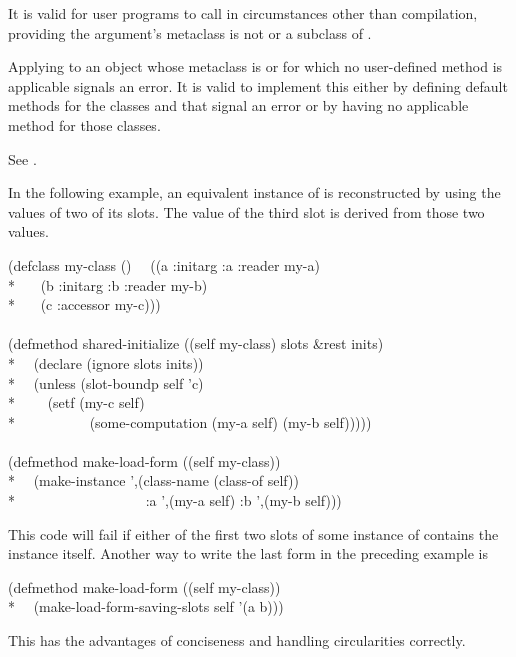 \begin{newer}
\begin{defun}
  It is valid for user programs to call  in
  circumstances other than compilation, providing the argument's
  metaclass is not  or a subclass of .

  Applying  to an object whose metaclass is  or
   for which no user-defined method is applicable signals
  an error.  It is valid to implement this either by defining default
  methods for the classes  and  that signal an error
  or by having no applicable method for those classes.

See .

In the following example, an equivalent instance of  is reconstructed
  by using the values of two of its slots.  The value of the third slot
  is derived from those two values.
\begin{lisp}
(defclass my-class ()
~~((a :initarg :a :reader my-a) \\*
~~~(b :initarg :b :reader my-b) \\*
~~~(c :accessor my-c))) \\
\\
(defmethod shared-initialize ((self my-class) slots \&rest inits) \\*
~~(declare (ignore slots inits)) \\*
~~(unless (slot-boundp self 'c) \\*
~~~~(setf (my-c self) \\*
~~~~~~~~~~(some-computation (my-a self) (my-b self))))) \\
\\
(defmethod make-load-form ((self my-class)) \\*
~~{\Xbq}(make-instance ',(class-name (class-of self)) \\*
~~~~~~~~~~~~~~~~~~:a ',(my-a self) :b ',(my-b self)))
\end{lisp}
This code will fail if either of the first two slots of some instance
of  contains the instance itself.
Another way to write the last form in the preceding example is
\begin{lisp}
(defmethod make-load-form ((self my-class)) \\*
~~(make-load-form-saving-slots self '(a b)))
\end{lisp}
This has the advantages of conciseness and handling circularities correctly.


\end{defun}
\end{newer}

